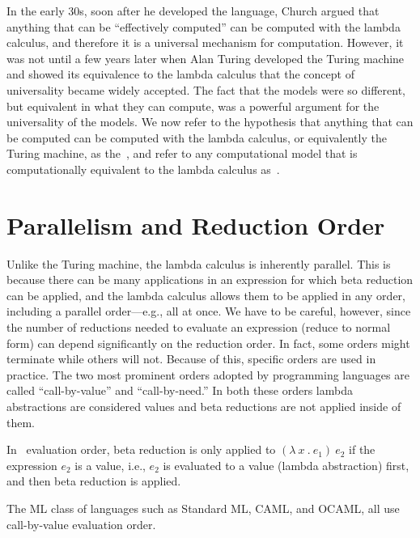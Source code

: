\begin{gram}
In the early 30s, soon after he developed the language, Church argued that anything that can be ``effectively
computed'' can be computed with the lambda calculus, and therefore
it is a universal mechanism for computation.  
%
However, it was not until a few years later when Alan Turing developed
the Turing machine and showed its equivalence to the lambda calculus
that the concept of universality became widely accepted.  The fact
that the models were so different, but equivalent in what they can
compute, was a powerful argument for the universality of the models.
We now refer to the hypothesis that anything that can be computed can
be computed with the lambda calculus, or equivalently the Turing
machine, as the~, and refer to any
computational model that is computationally equivalent to the lambda
calculus as~.
\end{gram}

\section{Parallelism and Reduction Order}
\label{sec:lc::call-by-value-and-need}

\begin{gram} 
Unlike the Turing machine, the lambda calculus is inherently parallel.
This is because there can be many applications in an expression
for which beta reduction can be applied,
and the lambda calculus allows them to be applied in any order,
including a parallel order---e.g., all at once.
We have to be careful, however, since the number of reductions needed
to evaluate an expression (reduce to normal form) can depend
significantly on the reduction order.  In fact, some orders might
terminate while others will not.
Because of this, specific orders are used in practice.
The two most prominent orders adopted by programming
languages are called ``call-by-value'' and
``call-by-need.''    
In both these orders lambda abstractions are considered values and 
beta reductions are not applied inside of them. 
\end{gram}

\begin{flex}
\begin{definition}
In~ evaluation order, beta reduction is only applied to
$(\lambda~x~.~e_1)~e_2$ if the expression $e_2$
is a value, i.e., $e_2$ is evaluated to a value (lambda abstraction)
first, and then
beta reduction is applied.
%

\end{definition}

\begin{example}
The ML class of languages such as Standard ML, CAML, and OCAML, all
use call-by-value evaluation order.
\end{example}

\end{flex}

